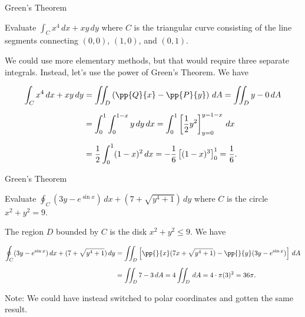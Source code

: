 \documentclass[11pt,english,
handout
]{beamer}
\begin{document}
\begin{frame}[t]{Green's Theorem}
\small
\begin{example}
Evaluate $\displaystyle \int_Cx^4\,dx+xy\,dy$ where $C$ is the triangular curve consisting of the line segments connecting $(0,0)$, $(1,0)$, and $(0,1)$.\pause

\lspace
We could use more elementary methods, but that would require three separate integrals. Instead, let's use the power of Green's Theorem. \pause We have

\begin{align*}
\int_Cx^4\,dx+xy\,dy&=\iint_D\left(\pp{Q}{x}-\pp{P}{y}\right)\,dA=\iint_Dy-0\,dA\\[2mm]
&=\int_0^1\int_0^{1-x}y\,dy\,dx=\int_0^1\left[\frac{1}{2}y^2\right]_{y=0}^{y=1-x}\,dx\\[2mm]
&=\frac{1}{2}\int_0^1(1-x)^2\,dx=-\frac{1}{6}\left[(1-x)^3\right]_0^1=\frac{1}{6}.
\end{align*}
\end{example}
\end{frame}










\begin{frame}[t]{Green's Theorem}
\small
\begin{example}
Evaluate $\displaystyle \oint_C(3y-e^{\sin x})\,dx+(7+\sqrt{y^4+1})\,dy$ where $C$ is the circle $x^2+y^2=9$.\pause 

\lspace
The region $D$ bounded by $C$ is the disk $x^2+y^2\leq 9$. \pause We have

{\scriptsize
\begin{align*}
\oint_C(3y-e^{\sin x})\,dx+(7+\sqrt{y^4+1})\,dy&=\iint_D\left[\pp{}{x}(7x+\sqrt{y^4+1})-\pp{}{y}(3y-e^{\sin x})\right]\,dA\\[2mm]
&=\iint_D7-3\,dA=4\iint_D\,dA=4\cdot\pi(3)^2=36\pi.
\end{align*}}\pause 

Note: We could have instead switched to polar coordinates and gotten the same result.
\end{example}
\end{frame}
\end{document}

